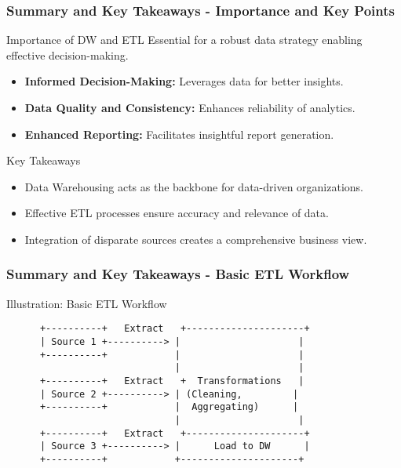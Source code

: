 \documentclass{beamer}
\begin{document}
\begin{frame}[fragile]
    \frametitle{Summary and Key Takeaways - Importance and Key Points}
    \begin{block}{Importance of DW and ETL}
        Essential for a robust data strategy enabling effective decision-making.
    \end{block}
    \begin{itemize}
        \item \textbf{Informed Decision-Making:} Leverages data for better insights.
        \item \textbf{Data Quality and Consistency:} Enhances reliability of analytics.
        \item \textbf{Enhanced Reporting:} Facilitates insightful report generation.
    \end{itemize}
    
    \begin{block}{Key Takeaways}
        \begin{itemize}
            \item Data Warehousing acts as the backbone for data-driven organizations.
            \item Effective ETL processes ensure accuracy and relevance of data.
            \item Integration of disparate sources creates a comprehensive business view.
        \end{itemize}
    \end{block}
\end{frame}

\begin{frame}[fragile]
    \frametitle{Summary and Key Takeaways - Basic ETL Workflow}
    \begin{block}{Illustration: Basic ETL Workflow}
        \begin{center}
            \begin{verbatim}
      +----------+   Extract   +---------------------+
      | Source 1 +----------> |                     |
      +----------+            |                     |
                              |                     |
      +----------+   Extract   +  Transformations   |
      | Source 2 +----------> | (Cleaning,         |
      +----------+            |  Aggregating)      |
                              |                     |
      +----------+   Extract   +---------------------+
      | Source 3 +----------> |      Load to DW      |
      +----------+            +---------------------+
            \end{verbatim}
        \end{center}
    \end{block}
\end{frame}
\end{document}
